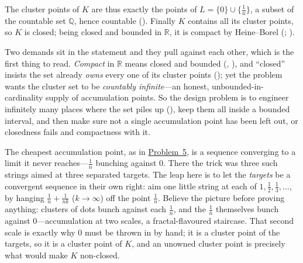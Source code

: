 \documentclass[main.tex]{subfiles}
\begin{document}
\begin{SolutionBlue}
The cluster points of $K$ are thus exactly the points of $L=\{0\}\cup\{\tfrac1n\}$, a subset of the countable
set $\mathbb Q$, hence countable ().
Finally $K$ contains all its cluster points, so $K$ is closed; being closed and bounded in $\mathbb R$, it is
compact by Heine--Borel (; ).
\end{SolutionBlue}

\begin{Reflection}
Two demands sit in the statement and they pull against each other, which is the first thing to read.
\emph{Compact} in $\mathbb R$ means closed and bounded (, ),
and ``closed'' insists the set already \emph{owns} every one of its cluster points (); yet the
problem wants the cluster set to be \emph{countably infinite}---an honest, unbounded-in-cardinality supply of
accumulation points. So the design problem is to engineer infinitely many places where the set piles up
(), keep them all inside a bounded interval, and then make sure not a single accumulation point
has been left out, or closedness fails and compactness with it.

The cheapest accumulation point, as in \hyperlink{prob:5}{Problem~5}, is a sequence converging to a limit it
never reaches---$\tfrac1n$ bunching against $0$. There the trick was three such strings aimed at three
separated targets. The leap here is to let the \emph{targets} be a convergent sequence in their own right:
aim one little string at each of $1,\tfrac12,\tfrac13,\dots$, by hanging $\tfrac1n+\tfrac1{nk}$ ($k\to\infty$)
off the point $\tfrac1n$. Believe the picture before proving anything: clusters of dots bunch against each
$\tfrac1n$, and the $\tfrac1n$ themselves bunch against $0$---accumulation at two scales, a fractal-flavoured
staircase. That second scale is exactly why $0$ must be thrown in by hand; it is a cluster point of the
targets, so it is a cluster point of $K$, and an unowned cluster point is precisely what would make $K$
non-closed.


\end{Reflection}
\end{document}
